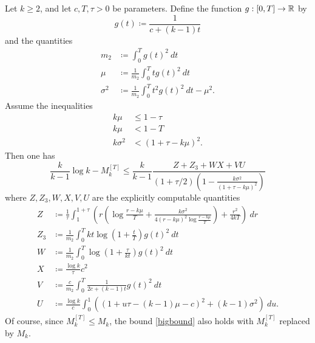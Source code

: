 \begin{theorem}\label{explicit}  Let $k \geq 2$, and let $c,T,\tau > 0$ be parameters.  Define the function $g: [0,T] \to \mathbb{R}$ by
\begin{equation}\label{g-def}
 g(t) \coloneqq \frac{1}{c + (k-1) t}
\end{equation}
and the quantities
\begin{align}
m_2 &\coloneqq \int_0^T g(t)^2\ dt \label{m2-def}\\
\mu &\coloneqq \frac{1}{m_2} \int_0^T t g(t)^2\ dt \label{mu-def}\\
\sigma^2 &\coloneqq \frac{1}{m_2} \int_0^T t^2 g(t)^2\ dt - \mu^2.\label{sigma-def}
\end{align}
Assume the inequalities
\begin{align}
k\mu &\leq 1-\tau \label{tau-bound}\\
k\mu &< 1-T \label{T-bound}\\
k\sigma^2 &< (1+\tau-k\mu)^2. \label{ksb}
\end{align}
Then one has
\begin{equation}\label{bigbound}
 \frac{k}{k-1} \log k - M_k^{[T]} \leq \frac{k}{k-1} \frac{Z + Z_3 + WX + VU}{(1+\tau/2) (1 - \frac{k\sigma^2}{(1+\tau-k\mu)^2})}
\end{equation}
where $Z, Z_3, W, X, V, U$ are the explicitly computable quantities
\begin{align}
Z &\coloneqq \frac{1}{\tau} \int_1^{1+\tau}\left( r\left(\log\frac{r-k\mu}{T} + \frac{k\sigma^2}{4(r-k\mu)^2 \log \frac{r-k\mu}{T}} \right) + \frac{r^2}{4kT}\right)\ dr\label{z-def}\\
Z_3 &\coloneqq \frac{1}{m_2} \int_0^T kt \log(1+\frac{t}{T}) g(t)^2\ dt \label{z3-def}\\
W &\coloneqq \frac{1}{m_2} \int_0^T \log(1+\frac{\tau}{kt}) g(t)^2\ dt\label{W-def}\\
X &\coloneqq \frac{\log k}{\tau} c^2 \label{X-def}\\
V &\coloneqq \frac{c}{m_2} \int_0^T \frac{1}{2c + (k-1)t} g(t)^2\ dt \label{V-def} \\
U &\coloneqq \frac{\log k}{c} \int_0^1 \left((1 + u\tau- (k-1)\mu- c)^2 + (k-1) \sigma^2\right)\ du.\label{U-def}
\end{align}
Of course, since $M_k^{[T]} \leq M_k$, the bound \eqref{bigbound} also holds with $M_k^{[T]}$ replaced by $M_k$.
\end{theorem}

